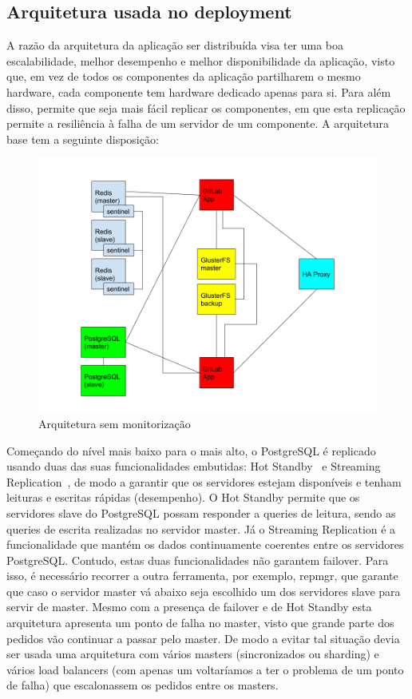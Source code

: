 \documentclass{article}
\begin{document}
\subsection{Arquitetura usada no deployment}
A razão da arquitetura da aplicação ser distribuída visa ter uma boa escalabilidade, melhor desempenho e melhor disponibilidade da aplicação, visto que, em vez de todos os componentes da aplicação partilharem o mesmo hardware, cada componente tem hardware dedicado apenas para si. Para além disso, permite que seja mais fácil replicar os componentes, em que esta replicação permite a resiliência à falha de um servidor de um componente. A arquitetura base tem a seguinte disposição:
\begin{figure}[H]
    \centering
    \includegraphics[width=15cm]{archBase.png}
    \caption{Arquitetura sem monitorização}
    \label{fig:archBase}
\end{figure}
Começando do nível mais baixo para o mais alto, o PostgreSQL é replicado usando duas das suas funcionalidades embutidas: Hot Standby~\cite{HotSt} e Streaming Replication~\cite{StRep}, de modo a garantir que os servidores estejam disponíveis e tenham leituras e escritas rápidas (desempenho). O Hot Standby permite que os servidores slave do PostgreSQL possam responder a queries de leitura, sendo as queries de escrita realizadas no servidor master. Já o Streaming Replication é a funcionalidade que mantém os dados continuamente coerentes entre os servidores PostgreSQL. Contudo, estas duas funcionalidades não garantem failover. Para isso, é necessário recorrer a outra ferramenta, por exemplo, repmgr, que garante que caso o servidor master vá abaixo seja escolhido um dos servidores slave para servir de master. Mesmo com a presença de failover e de Hot Standby esta arquitetura apresenta um ponto de falha no master, visto que grande parte dos pedidos vão continuar a passar pelo master. De modo a evitar tal situação devia ser usada uma arquitetura com vários masters (sincronizados ou sharding) e vários load balancers (com apenas um voltaríamos a ter o problema de um ponto de falha) que escalonassem os pedidos entre os masters.
\end{document}

